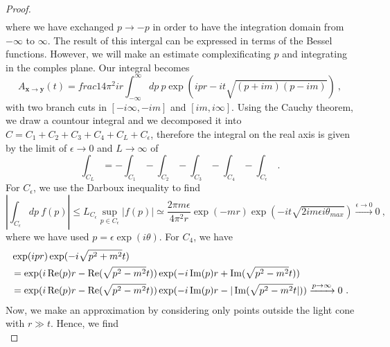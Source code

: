 \begin{proof}
\begin{equation*}
\begin{aligned}
        \end{aligned}
        \end{equation*}
        where we have exchanged $p \rightarrow -p$ in order to have the integration domain from $-\infty$ to $\infty$. The result of this intergal can be expressed in terms of the Bessel functions. However, we will make an estimate complexificating $p$ and integrating in the comples plane. Our integral becomes 
        \begin{equation*}
            A_{\mathbf x \rightarrow \mathbf y} (t) = frac{1}{4 \pi^2 i r} \int_{-\infty}^\infty dp ~ p \exp(i p r - i t \sqrt{(p + im) (p - im)}) ~,
        \end{equation*}
        with two branch cuts in $[-i\infty, -im]$ and $[im, i\infty]$. Using the Cauchy theorem, we draw a countour integral and we decomposed it into $C = C_1 + C_2 + C_3 + C_4 + C_L + C_\epsilon$, therefore the integral on the real axis is given by the limit of $\epsilon \rightarrow 0$ and $L \rightarrow \infty$ of
        \begin{equation*}
            \int_{C_L} = - \int_{C_1} - \int_{C_2} - \int_{C_3} - \int_{C_4} - \int_{C_\epsilon} ~.
        \end{equation*}
        For $C_\epsilon$, we use the Darboux inequality to find 
        \begin{equation*}
            |\int_{C_\epsilon} dp ~ f(p)| \leq L_{C_\epsilon} \sup_{p \in C_\epsilon} |f(p)| \simeq \frac{2\pi m \epsilon}{4 \pi^2 r}  \exp(-mr) \exp(- it \sqrt{2im \epsilon i \theta_{max}}) \xrightarrow{\epsilon \rightarrow 0} 0 ~,
        \end{equation*}
        where we have used $p = \epsilon \exp(i \theta)$. 
        For $C_4$, we have 
        \begin{equation*}
        \begin{aligned}
            & \exp(ipr) \exp(- i \sqrt{p^2 + m^2}t )  \\ & = \exp(i \operatorname{Re} (p) r - \operatorname{Re} (\sqrt{p^2 - m^2}t)) \exp(-i \operatorname{Im} (p) r + \operatorname{Im} (\sqrt{p^2 - m^2}t)) \\ & = \exp(i \operatorname{Re} (p) r - \operatorname{Re} (\sqrt{p^2 - m^2}t)) \exp(-i \operatorname{Im} (p) r - |\operatorname{Im} (\sqrt{p^2 - m^2}t|)) \xrightarrow{p \rightarrow \infty} 0 ~.
        \end{aligned}
        \end{equation*}
        Now, we make an approximation by considering only points outside the light cone with $r \gg t$. Hence, we find 
        \begin{equation*}

\end{equation*}
\end{proof}

